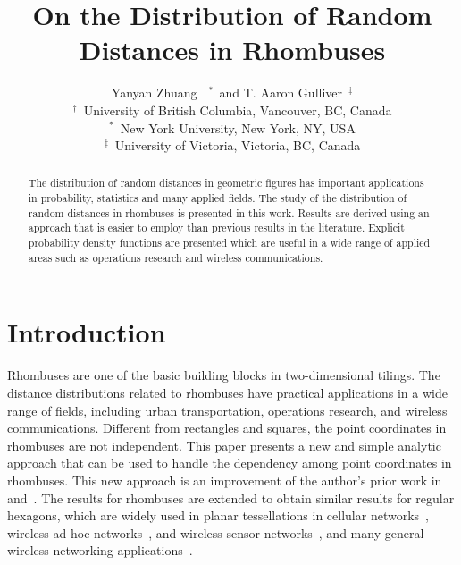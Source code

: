 \documentclass[12pt,draftclsnofoot,onecolumn]{IEEEtran}
\begin{document}
\title{On the Distribution of Random\\Distances in Rhombuses}

\author{Yanyan Zhuang~$^{\dagger *}$ and T. Aaron Gulliver~$^\ddagger$\\
$^\dagger$~University of British Columbia, Vancouver, BC, Canada\\
$^*$~New York University, New York, NY, USA\\
$^\ddagger$~University of Victoria, Victoria, BC, Canada}

\maketitle
\thispagestyle{empty}

\begin{abstract}
The distribution of random distances in geometric figures has important
applications in probability, statistics and many applied fields.
The study of the distribution of random distances in rhombuses is presented
in this work. Results are derived using an approach that is easier to
employ than previous results in the literature. Explicit
probability density functions are presented which are useful in a wide range of applied
areas such as operations research and wireless communications.
\end{abstract}

\section{Introduction}
Rhombuses are one of the basic building blocks in two-dimensional tilings. The
distance distributions related to rhombuses have practical applications in a
wide range of fields, including urban transportation, operations research, and wireless communications.
Different from rectangles and squares, the point coordinates in rhombuses are
not independent. This paper presents a new and simple analytic approach that can be used
to handle the dependency among point coordinates in rhombuses. This new approach
is an improvement of the author's prior work in~\cite{zhuang2011random}
and~\cite{zhuang2012geometrical}. The results for rhombuses are extended
to obtain similar results for regular hexagons, which
are widely used in planar tessellations in cellular
networks~\cite{zhuang2011geometric}, wireless ad-hoc
networks~\cite{zhuang2013planar}, and wireless sensor
networks~\cite{schwiebert2001research, chang2008hexagonal, wang2009analytical},
and many general wireless networking applications~\cite{baltzis2012distance}.
\end{document}
